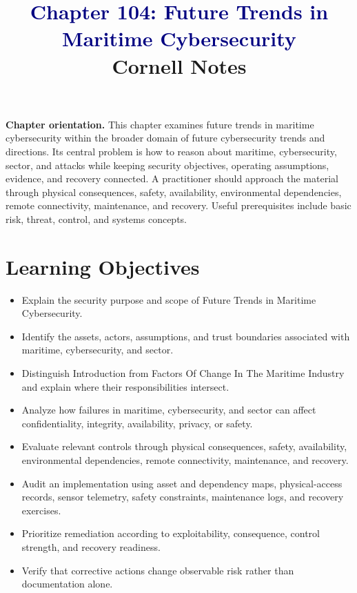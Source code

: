 \documentclass[11pt]{article}
\title{\textcolor{Navy}{Chapter 104: Future Trends in Maritime Cybersecurity}\\[2mm]\large Cornell Notes}
\author{}
\date{}
\begin{document}
\maketitle
\thispagestyle{fancy}
\vspace{-1.5em}
\begin{orientationbox}
\textbf{Chapter orientation.} This chapter examines future trends in maritime cybersecurity within the broader domain of future cybersecurity trends and directions. Its central problem is how to reason about maritime, cybersecurity, sector, and attacks while keeping security objectives, operating assumptions, evidence, and recovery connected. A practitioner should approach the material through physical consequences, safety, availability, environmental dependencies, remote connectivity, maintenance, and recovery. Useful prerequisites include basic risk, threat, control, and systems concepts.
\end{orientationbox}
\section*{Learning Objectives}
\begin{itemize}
\item Explain the security purpose and scope of Future Trends in Maritime Cybersecurity.
\item Identify the assets, actors, assumptions, and trust boundaries associated with maritime, cybersecurity, and sector.
\item Distinguish Introduction from Factors Of Change In The Maritime Industry and explain where their responsibilities intersect.
\item Analyze how failures in maritime, cybersecurity, and sector can affect confidentiality, integrity, availability, privacy, or safety.
\item Evaluate relevant controls through physical consequences, safety, availability, environmental dependencies, remote connectivity, maintenance, and recovery.
\item Audit an implementation using asset and dependency maps, physical-access records, sensor telemetry, safety constraints, maintenance logs, and recovery exercises.
\item Prioritize remediation according to exploitability, consequence, control strength, and recovery readiness.
\item Verify that corrective actions change observable risk rather than documentation alone.
\end{itemize}
\end{document}
